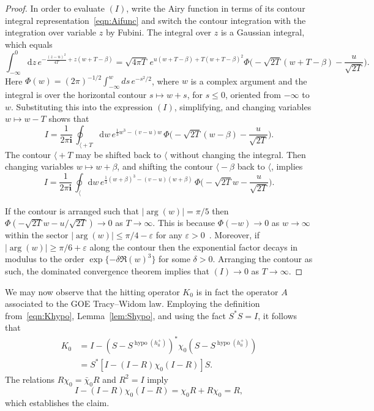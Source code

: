 \documentclass[AHL,Unicode,longabstracts]{cedram}
\newcommand*{\dd}{\mathrm{d}}
\newcommand*{\myangle}{\mathord{\langle}} %
\DeclareMathOperator{\hypo}{hypo}
\DeclareMathOperator{\argl}{arg}
\newcommand{\eps}{\varepsilon}
\begin{document}
\begin{proof}
In order to evaluate $(I)$, write the Airy function in terms of its contour integral representation~\eqref{eqn:Aifunc} and switch the contour integration with the integration over variable $z$ by Fubini. The integral over $z$ is a Gaussian integral, which equals
\begin{equation*}
\int_{-\infty}^0 \dd z \, e^{-\frac{(z-u)^2}{4T}+z(w+T-\beta)} =
\sqrt{4 \pi T} \, e^{ u(w+T-\beta) + T(w+T-\beta)^2} \Phi \Big(-\sqrt{2T}(w+T-\beta) - \frac{u}{\sqrt{2T}} \Big).
\end{equation*}
Here $\Phi(w) = (2 \pi)^{-1/2} \int_{-\infty}^w ds \,e^{- s^2/2}$, where $w$ is a complex argument and the integral is over the horizontal contour $s \mapsto w + s$, for $s \leq 0$, oriented from $-\infty$ to $w$. Substituting this into the expression $(I)$, simplifying, and changing variables $w \mapsto w-T$ shows that
\[
I = \frac{1}{2 \pi \mathbf{i}}\, \oint_{\myangle+T} \dd w\, e^{ \frac{1}{3}w^3 -(v-u)w}\,
\Phi \Big (-\sqrt{2T}(w-\beta) - \frac{u}{\sqrt{2T}} \Big).
\]
The contour $\myangle +T$ may be shifted back to $\myangle$ without changing the integral. Then changing variables $w \mapsto w + \beta$, and shifting the contour $\myangle - \beta$ back to $\myangle$, implies
\[
I = \frac{1}{2 \pi \mathbf{i}}\, \oint_{\myangle} \dd w\, e^{ \frac{1}{3}(w+\beta)^3 -(v-u)(w+\beta)}\,
\Phi \Big (-\sqrt{2T}w - \frac{u}{\sqrt{2T}} \Big).
\]

If the contour is arranged such that $| \argl(w)| = \pi/5$ then $\Phi(-\sqrt{2T}w - u / \sqrt{2T}) \to 0$ as $T \to \infty$. This is because $\Phi(-w) \to 0$ as $w \to \infty$ within the sector $\mathopen|\argl(w)|\leq \pi/4 - \eps$ for any $\eps > 0$~\cite[Eq.~7.2.4]{Nist}. Moreover, if $\mathopen|\argl(w)| \geq \pi/6 +\eps$ along the contour then the exponential factor decays in modulus to the order $\exp \{-\delta \Re(w)^3\}$ for some $\delta > 0$. Arranging the contour as such, the dominated convergence theorem implies that $(I) \to 0$ as $T \to \infty$.
\end{proof}

We may now observe that the hitting operator $K_0$ is in fact the operator $A$ associated to the GOE Tracy--Widom law. Employing the definition from~\eqref{eqn:Khypo}, Lemma~\ref{lem:Shypo}, and using the fact $S^{*}S = I$, it follows that
\begin{align*}
K_0 &= I - (S- S^{\hypo(h^{+}_0)})^{*} \chi_0 (S- S^{\hypo(h^{+}_0)}) \\
\nonumber &= S^{*} [I - (I-R)\chi_0(I-R)] S.
\end{align*}
The relations $R \chi_0 = \bar{\chi}_0 R$ and $R^2 = I$ imply
\[
I - (I-R)\chi_0(I-R) = \chi_0 R + R \chi_0 = R,
\]
which establishes the claim.
\end{document}
